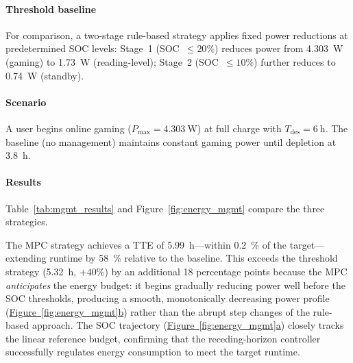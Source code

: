 \documentclass[5p,times,number]{elsarticle}
\newcommand{\figref}[1]{\hyperref[#1]{\textup{Figure~\ref*{#1}}}}
\newcommand{\tabref}[1]{\hyperref[#1]{\textup{Table~\ref*{#1}}}}
\def\figref#1{Figure~\ref{#1}}
\def\tabref#1{Table~\ref{#1}}
\begin{document}
\paragraph{Threshold baseline}
For comparison, a two-stage rule-based strategy applies fixed power reductions at predetermined SOC levels: Stage~1 (SOC~$\le 20\%$) reduces power from \SI{4.303}{\watt} (gaming) to \SI{1.73}{\watt} (reading-level); Stage~2 (SOC~$\le 10\%$) further reduces to \SI{0.74}{\watt} (standby).

\paragraph{Scenario}
A user begins online gaming ($P_{\max} = \SI{4.303}{\watt}$) at full charge with $T_{\mathrm{des}} = \SI{6}{\hour}$.
The baseline (no management) maintains constant gaming power until depletion at \SI{3.8}{\hour}.

\paragraph{Results}
\tabref{tab:mgmt_results} and \figref{fig:energy_mgmt} compare the three strategies.
\begin{table}[!tb]
\caption{Energy management strategy comparison (Gaming, \SI{5000}{\milli\ampere\hour}, \SI{25}{\degreeCelsius}).}\label{tab:mgmt_results}
\centering
{}
\end{table}



The MPC strategy achieves a TTE of \SI{5.99}{\hour}---within \SI{0.2}{\percent} of the target---extending runtime by \SI{58}{\percent} relative to the baseline.
This exceeds the threshold strategy (\SI{5.32}{\hour}, $+40\%$) by an additional 18 percentage points because the MPC \emph{anticipates} the energy budget:
it begins gradually reducing power well before the SOC thresholds, producing a smooth, monotonically decreasing power profile (\hyperref[fig:energy_mgmt]{\textup{Figure~\ref*{fig:energy_mgmt}b}}) rather than the abrupt step changes of the rule-based approach.
The SOC trajectory (\hyperref[fig:energy_mgmt]{\textup{Figure~\ref*{fig:energy_mgmt}a}}) closely tracks the linear reference budget, confirming that the receding-horizon controller successfully regulates energy consumption to meet the target runtime.
\end{document}
